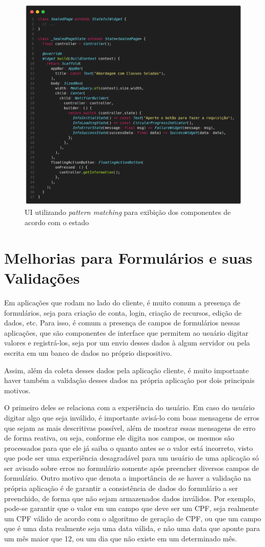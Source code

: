 \documentclass[12pt, %
openright, 
oneside, %
a4paper,    %
brazil]{facom-ufu-abntex2}
\begin{document}
\begin{figure}[ht]
    \centering
    \includegraphics[width=.65\textwidth, trim={0 30 0 100}, clip]{figures/states/sealed_page.png}
    \caption{UI utilizando \textit{pattern matching} para exibição dos componentes de acordo com o estado}
    \label{fig:sealed_page}
\end{figure}

\section{Melhorias para Formulários e suas Validações} \label{sec:forms}

Em aplicações que rodam no lado do cliente, é muito comum a presença de formulários, seja para criação de conta, login, criação de recursos, edição de dados, etc. Para isso, é comum a presença de campos de formulários nessas aplicações, que são componentes de interface que permitem ao usuário digitar valores e registrá-los, seja por um envio desses dados à algum servidor ou pela escrita em um banco de dados no próprio dispositivo.

Assim, além da coleta desses dados pela aplicação cliente, é muito importante haver também a validação desses dados na própria aplicação por dois principais motivos.

O primeiro deles se relaciona com a experiência do usuário. Em caso do usuário digitar algo que seja inválido, é importante avisá-lo com boas mensagens de erros que sejam as mais descritivas possível, além de mostrar essas mensagens de erro de forma reativa, ou seja, conforme ele digita nos campos, os mesmos são processados para que ele já saiba o quanto antes se o valor está incorreto, visto que pode ser uma experiência desagradável para um usuário de uma aplicação só ser avisado sobre erros no formulário somente após preencher diversos campos de formulário. Outro motivo que denota a importância de se haver a validação na própria aplicação é de garantir a consistência de dados do formulário a ser preenchido, de forma que não sejam armazenados dados inválidos. Por exemplo, pode-se garantir que o valor em um campo que deve ser um CPF, seja realmente um CPF válido de acordo com o algoritmo de geração de CPF, ou que um campo que é uma data realmente seja uma data válida, e não uma data que aponte para um mês maior que 12, ou um dia que não existe em um determinado mês.
\end{document}
